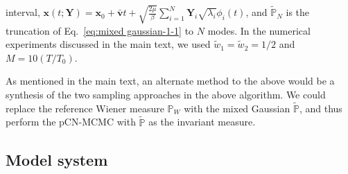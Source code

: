 interval, $\mathbf{x}(t;\mathbf{Y})=\mathbf{x}_{0}+\bar{\mathbf{v}}t+\sqrt{\frac{2\mu}{\beta}}\sum_{i=1}^{N}\mathbf{Y}_{i}\sqrt{\lambda_{i}}\phi_{i}(t)$,
and $\tilde{\mathbb{P}}_{N}$ is the truncation of Eq.~\eqref{eq:mixed gaussian-1-1}
to $N$ modes. In the numerical experiments discussed in the main
text, we used $\tilde{w}_{1}=\tilde{w}_{2}=1/2$ and $M=10(T/T_{0})$.

As mentioned in the main text, an alternate method to the above would
be a synthesis of the two sampling approaches in the above algorithm.
We could replace the reference Wiener measure $\mathbb{P}_{W}$ with
the mixed Gaussian $\tilde{\mathbb{P}}$, and thus perform the pCN-MCMC
with $\tilde{\mathbb{P}}$ as the invariant measure.


\subsection{Model system}

